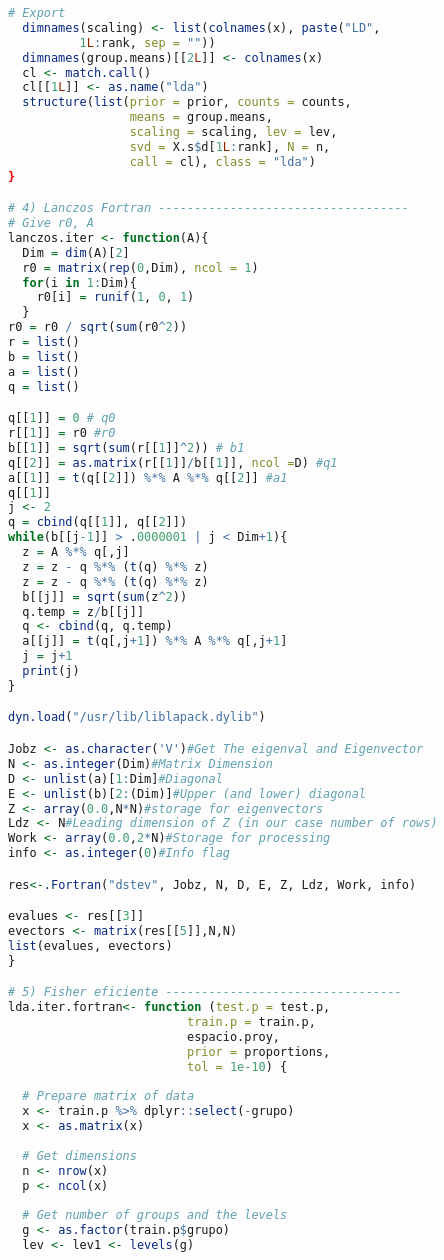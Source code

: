 \begin{lstlisting}[language=R, basicstyle=\small]
  # Export
  dimnames(scaling) <- list(colnames(x), paste("LD",
          1L:rank, sep = ""))
  dimnames(group.means)[[2L]] <- colnames(x)
  cl <- match.call()
  cl[[1L]] <- as.name("lda")
  structure(list(prior = prior, counts = counts, 
                 means = group.means, 
                 scaling = scaling, lev = lev, 
                 svd = X.s$d[1L:rank], N = n, 
                 call = cl), class = "lda")
}

# 4) Lanczos Fortran -----------------------------------
# Give r0, A
lanczos.iter <- function(A){
  Dim = dim(A)[2]
  r0 = matrix(rep(0,Dim), ncol = 1)
  for(i in 1:Dim){
    r0[i] = runif(1, 0, 1) 
  }
r0 = r0 / sqrt(sum(r0^2))
r = list()
b = list()
a = list()
q = list()

q[[1]] = 0 # q0
r[[1]] = r0 #r0
b[[1]] = sqrt(sum(r[[1]]^2)) # b1
q[[2]] = as.matrix(r[[1]]/b[[1]], ncol =D) #q1
a[[1]] = t(q[[2]]) %*% A %*% q[[2]] #a1
q[[1]]
j <- 2
q = cbind(q[[1]], q[[2]])
while(b[[j-1]] > .0000001 | j < Dim+1){
  z = A %*% q[,j]
  z = z - q %*% (t(q) %*% z)
  z = z - q %*% (t(q) %*% z)
  b[[j]] = sqrt(sum(z^2))
  q.temp = z/b[[j]]
  q <- cbind(q, q.temp)
  a[[j]] = t(q[,j+1]) %*% A %*% q[,j+1]
  j = j+1
  print(j)
}

dyn.load("/usr/lib/liblapack.dylib")

Jobz <- as.character('V')#Get The eigenval and Eigenvector
N <- as.integer(Dim)#Matrix Dimension
D <- unlist(a)[1:Dim]#Diagonal
E <- unlist(b)[2:(Dim)]#Upper (and lower) diagonal
Z <- array(0.0,N*N)#storage for eigenvectors
Ldz <- N#Leading dimension of Z (in our case number of rows)
Work <- array(0.0,2*N)#Storage for processing
info <- as.integer(0)#Info flag

res<-.Fortran("dstev", Jobz, N, D, E, Z, Ldz, Work, info)

evalues <- res[[3]]
evectors <- matrix(res[[5]],N,N)
list(evalues, evectors)
}

# 5) Fisher eficiente ---------------------------------
lda.iter.fortran<- function (test.p = test.p, 
                         train.p = train.p, 
                         espacio.proy,
                         prior = proportions,
                         tol = 1e-10) {
  
  # Prepare matrix of data
  x <- train.p %>% dplyr::select(-grupo)
  x <- as.matrix(x)
  
  # Get dimensions
  n <- nrow(x)
  p <- ncol(x)
  
  # Get number of groups and the levels
  g <- as.factor(train.p$grupo)
  lev <- lev1 <- levels(g)
  

\end{lstlisting}
